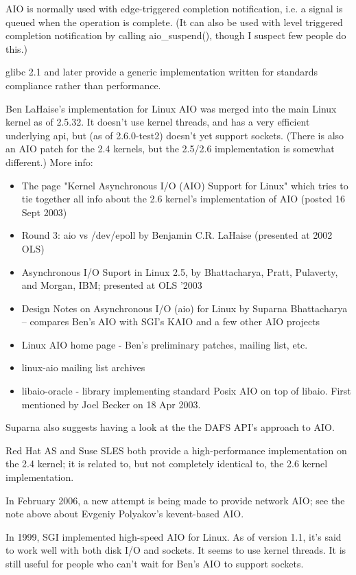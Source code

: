 \documentclass[twoside, xetex]{report}
\begin{document}
AIO is normally used with edge-triggered completion notification, i.e. a signal is queued when the operation is complete. (It can also be used with level triggered completion notification by calling aio\_suspend(), though I suspect few people do this.)

glibc 2.1 and later provide a generic implementation written for standards compliance rather than performance.

Ben LaHaise's implementation for Linux AIO was merged into the main Linux kernel as of 2.5.32. It doesn't use kernel threads, and has a very efficient underlying api, but (as of 2.6.0-test2) doesn't yet support sockets. (There is also an AIO patch for the 2.4 kernels, but the 2.5/2.6 implementation is somewhat different.) More info:

\begin{itemize}
\item The page "Kernel Asynchronous I/O (AIO) Support for Linux" which tries to tie together all info about the 2.6 kernel's implementation of AIO (posted 16 Sept 2003)
\item Round 3: aio vs /dev/epoll by Benjamin C.R. LaHaise (presented at 2002 OLS)
\item Asynchronous I/O Suport in Linux 2.5, by Bhattacharya, Pratt, Pulaverty, and Morgan, IBM; presented at OLS '2003
\item Design Notes on Asynchronous I/O (aio) for Linux by Suparna Bhattacharya -- compares Ben's AIO with SGI's KAIO and a few other AIO projects
\item Linux AIO home page - Ben's preliminary patches, mailing list, etc.
\item linux-aio mailing list archives
\item libaio-oracle - library implementing standard Posix AIO on top of libaio. First mentioned by Joel Becker on 18 Apr 2003.
\end{itemize}

Suparna also suggests having a look at the the DAFS API's approach to AIO.

Red Hat AS and Suse SLES both provide a high-performance implementation on the 2.4 kernel; it is related to, but not completely identical to, the 2.6 kernel implementation.

In February 2006, a new attempt is being made to provide network AIO; see the note above about Evgeniy Polyakov's kevent-based AIO.

In 1999, SGI implemented high-speed AIO for Linux. As of version 1.1, it's said to work well with both disk I/O and sockets. It seems to use kernel threads. It is still useful for people who can't wait for Ben's AIO to support sockets.
\end{document}
